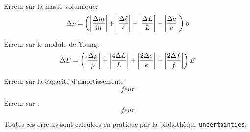 Erreur sur la masse volumique:
\begin{equation}
    \Delta \rho = \left(\left|\frac{\Delta m}{m}\right| + \left|\frac{\Delta \ell}{\ell}\right| + \left|\frac{\Delta L}{L}\right| + \left|\frac{\Delta e}{e}\right|\right) \rho
\end{equation}

Erreur sur le module de Young:
\begin{equation}
    \Delta E = \left(\left|\frac{\Delta \rho}{\rho}\right| + \left|\frac{4\Delta L}{L}\right| + \left|\frac{2\Delta e}{e}\right| + \left|\frac{2\Delta f}{f}\right| \right) E
\end{equation}

Erreur sur la capacité d'amortissement:
\begin{equation}
    feur
\end{equation}

Erreur sur :
\begin{equation}
    feur
\end{equation}

Toutes ces erreurs sont calculées en pratique par la bibliothèque \texttt{uncertainties}.
